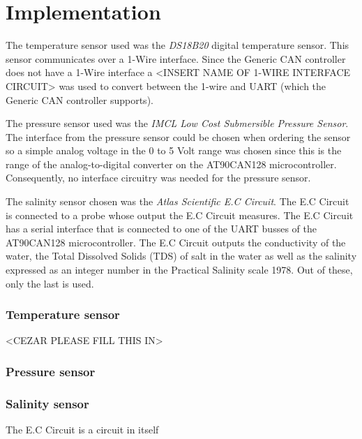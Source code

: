 
\section{Implementation}\label{sec:implementation}
The temperature sensor used was the \emph{DS18B20} digital temperature sensor. This sensor communicates over a 1-Wire interface. Since the Generic CAN controller does not have a 1-Wire interface a <INSERT NAME OF 1-WIRE INTERFACE CIRCUIT> was used to convert between the 1-wire and UART (which the Generic CAN controller supports).

The pressure sensor used was the \emph{IMCL Low Cost Submersible Pressure Sensor}. The interface from the pressure sensor could be chosen when ordering the sensor so a simple analog voltage in the 0 to 5 Volt range was chosen since this is the range of the analog-to-digital converter on the AT90CAN128 microcontroller. Consequently, no interface circuitry was needed for the pressure sensor.

The salinity sensor chosen was the \emph{Atlas Scientific E.C Circuit}. The E.C Circuit is connected to a probe whose output the E.C Circuit measures. The E.C Circuit has a serial interface that is connected to one of the UART busses of the AT90CAN128 microcontroller. The E.C Circuit outputs the conductivity of the water, the Total Dissolved Solids (TDS) of salt in the water as well as the salinity expressed as an integer number in the Practical Salinity scale 1978. Out of these, only the last is used. \newline

\subsubsection{Temperature sensor}
<CEZAR PLEASE FILL THIS IN>

\subsubsection{Pressure sensor}



\subsubsection{Salinity sensor}
The E.C Circuit is a circuit in itself 

